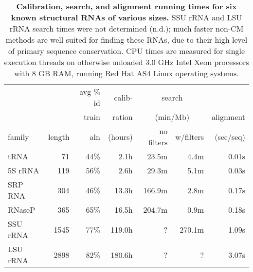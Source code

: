 \newpage
\begin{table}
\begin{center}
\begin{tabular}{lrrr|rr|r} 
       &           & avg \% id& calib-       & \multicolumn{2}{c|}{search}          &           \\
       &           & train    & ration       & \multicolumn{2}{c|}{(min/Mb)}        & alignment \\
family & length    & aln      & (hours)      & no filters& w/filters                & (sec/seq) \\\midrule
tRNA    & 71       & 44\%            &       2.1h   &     23.5m &       4.4m&  0.01s \\
5S rRNA & 119      & 56\%            &       2.6h   &     29.3m &       5.1m&  0.03s \\
SRP RNA & 304      & 46\%            &      13.3h   &    166.9m &       2.8m&  0.17s \\
RNaseP  & 365      & 65\%            &      16.5h   &    204.7m &       0.9m&  0.18s \\
SSU rRNA& 1545     & 77\%            &     119.0h   &         ? &     270.1m&  1.09s \\
LSU rRNA& 2898     & 82\%            &     180.6h   &         ? &          ?&  3.07s \\
\end{tabular}
%
% 
% 
%
%
\end{center}
\caption{\textbf{Calibration, search, and alignment running times for
    six known structural RNAs of various sizes.} SSU rRNA and LSU rRNA
    search times were not determined (n.d.); much faster non-CM
    methods are well suited for finding these RNAs, due to their high
    level of primary sequence conservation. CPU times are measured for
    single execution threads on otherwise unloaded 3.0 GHz Intel Xeon
    processors with 8 GB RAM, running Red Hat AS4 Linux operating
    systems.}
\label{tbl:times}
\end{table}
